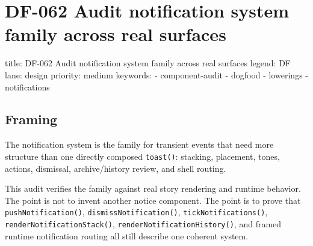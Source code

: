 \chapter{DF-062 Audit notification system family across real surfaces}\label{record-103}

\smallskip

\begin{RecordMeta}
title: DF-062 Audit notification system family across real surfaces
legend: DF
lane: design
priority: medium
keywords:
  - component-audit
  - dogfood
  - lowerings
  - notifications

\end{RecordMeta}

\section{Framing}\label{record-103-framing}

The notification system is the family for transient events that need more structure than one directly composed \texttt{t\allowbreak{}o\allowbreak{}a\allowbreak{}s\allowbreak{}t\allowbreak{}(\allowbreak{})}: stacking, placement, tones, actions, dismissal, archive/history review, and shell routing.

This audit verifies the family against real story rendering and runtime behavior. The point is not to invent another notice component. The point is to prove that \texttt{p\allowbreak{}u\allowbreak{}s\allowbreak{}h\allowbreak{}N\allowbreak{}o\allowbreak{}t\allowbreak{}i\allowbreak{}f\allowbreak{}i\allowbreak{}c\allowbreak{}a\allowbreak{}t\allowbreak{}i\allowbreak{}o\allowbreak{}n\allowbreak{}(\allowbreak{})}, \texttt{d\allowbreak{}i\allowbreak{}s\allowbreak{}m\allowbreak{}i\allowbreak{}s\allowbreak{}s\allowbreak{}N\allowbreak{}o\allowbreak{}t\allowbreak{}i\allowbreak{}f\allowbreak{}i\allowbreak{}c\allowbreak{}a\allowbreak{}t\allowbreak{}i\allowbreak{}o\allowbreak{}n\allowbreak{}(\allowbreak{})}, \texttt{t\allowbreak{}i\allowbreak{}c\allowbreak{}k\allowbreak{}N\allowbreak{}o\allowbreak{}t\allowbreak{}i\allowbreak{}f\allowbreak{}i\allowbreak{}c\allowbreak{}a\allowbreak{}t\allowbreak{}i\allowbreak{}o\allowbreak{}n\allowbreak{}s\allowbreak{}(\allowbreak{})}, \texttt{r\allowbreak{}e\allowbreak{}n\allowbreak{}d\allowbreak{}e\allowbreak{}r\allowbreak{}N\allowbreak{}o\allowbreak{}t\allowbreak{}i\allowbreak{}f\allowbreak{}i\allowbreak{}c\allowbreak{}a\allowbreak{}t\allowbreak{}i\allowbreak{}o\allowbreak{}n\allowbreak{}S\allowbreak{}t\allowbreak{}a\allowbreak{}c\allowbreak{}k\allowbreak{}(\allowbreak{})}, \texttt{r\allowbreak{}e\allowbreak{}n\allowbreak{}d\allowbreak{}e\allowbreak{}r\allowbreak{}N\allowbreak{}o\allowbreak{}t\allowbreak{}i\allowbreak{}f\allowbreak{}i\allowbreak{}c\allowbreak{}a\allowbreak{}t\allowbreak{}i\allowbreak{}o\allowbreak{}n\allowbreak{}H\allowbreak{}i\allowbreak{}s\allowbreak{}t\allowbreak{}o\allowbreak{}r\allowbreak{}y\allowbreak{}(\allowbreak{})}, and framed runtime notification routing all still describe one coherent system.

